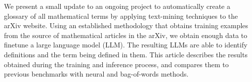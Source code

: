 We present a small update to an ongoing project to automatically create a glossary of all mathematical terms by applying text-mining techniques to the arXiv website. Using an established methodology that obtains training examples from the \latex source of mathematical articles in the arXiv, we obtain enough data to finetune a large language model (LLM). The resulting LLMs are able to identify definitions and the term being defined in them.  This article describes the results obtained during the training and inference process, and compares them to previous benchmarks with neural and bag-of-words methods.

